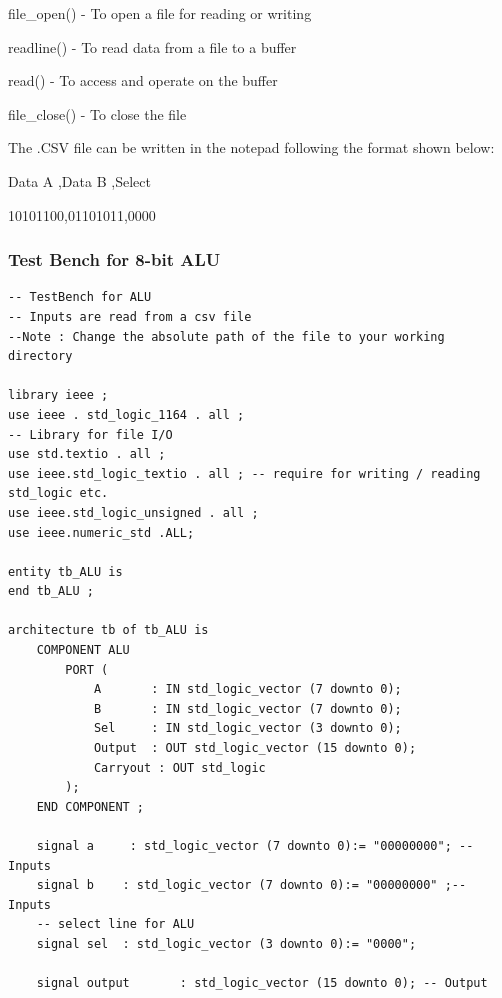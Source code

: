 \documentclass[12pt,singleside,a4paper]{article}
\begin{document}
\hspace{6mm}file\_open() - To open a file for reading or writing

readline() - To read data from a file to a buffer

read() - To access and operate on the buffer

file\_close() - To close the file

\vspace{5mm}

The .CSV file can be written in the notepad following the format shown below:

\vspace{5mm}

Data A  ,Data B  ,Select

10101100,01101011,0000

\subsubsection*{Test Bench for 8-bit ALU}
\begin{lstlisting}[style=VHDL, frame=single,linewidth = 18cm]
-- TestBench for ALU
-- Inputs are read from a csv file
--Note : Change the absolute path of the file to your working directory

library ieee ;
use ieee . std_logic_1164 . all ;
-- Library for file I/O
use std.textio . all ;
use ieee.std_logic_textio . all ; -- require for writing / reading std_logic etc.
use ieee.std_logic_unsigned . all ;
use ieee.numeric_std .ALL;

entity tb_ALU is
end tb_ALU ;

architecture tb of tb_ALU is
	COMPONENT ALU
		PORT (
			A 	    : IN std_logic_vector (7 downto 0);
			B 	    : IN std_logic_vector (7 downto 0);
			Sel 	: IN std_logic_vector (3 downto 0);
			Output 	: OUT std_logic_vector (15 downto 0);
			Carryout : OUT std_logic
		);
	END COMPONENT ;

	signal a 	 : std_logic_vector (7 downto 0):= "00000000"; -- Inputs
	signal b 	: std_logic_vector (7 downto 0):= "00000000" ;-- Inputs
	-- select line for ALU
	signal sel 	: std_logic_vector (3 downto 0):= "0000";
	
	signal output 		: std_logic_vector (15 downto 0); -- Output
	\end{lstlisting}
\end{document}
